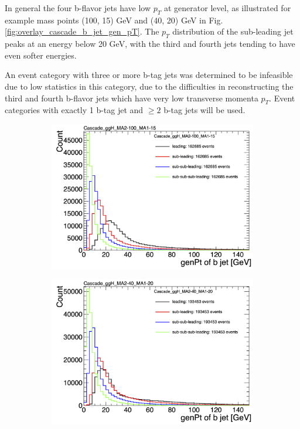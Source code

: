 In general the four b-flavor jets have low $p_{T}$ at generator level, as illustrated for example mass points (100, 15) GeV and (40, 20) GeV in Fig. \ref{fig:overlay_cascade_b_jet_gen_pT}. The $p_{T}$ distribution of the sub-leading jet peaks at an energy below 20 GeV, with the third and fourth jets tending to have even softer energies.

An event category with three or more b-tag jets was determined to be infeasible due to low statistics in this category, due to the difficulties in reconstructing the third and fourth b-flavor jets which have very low transverse momenta $p_{T}$. Event categories with exactly 1 b-tag jet and $\geq 2$ b-tag jets will be used.

\begin{figure}[h]
    \centering
    \begin{subfigure}{0.45\textwidth}
        \includegraphics[width=1.0\textwidth]{figures/ch-11-asymmetric/Cascade_ggH_MA2-100_MA1-15_overlay}
    \end{subfigure}
    \hfill
    \begin{subfigure}{0.45\textwidth}
        \includegraphics[width=1.0\textwidth]{figures/ch-11-asymmetric/Cascade_ggH_MA2-40_MA1-20_overlay}

\end{subfigure}
\end{figure}
